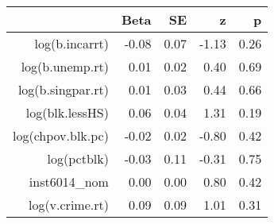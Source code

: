 \begin{table}[ht]
\centering
\begin{tabular}{rrrrr}
  \hline
 & Beta & SE & z & p \\ 
  \hline
log(b.incarrt) & -0.08 & 0.07 & -1.13 & 0.26 \\ 
  log(b.unemp.rt) & 0.01 & 0.02 & 0.40 & 0.69 \\ 
  log(b.singpar.rt) & 0.01 & 0.03 & 0.44 & 0.66 \\ 
  log(blk.lessHS) & 0.06 & 0.04 & 1.31 & 0.19 \\ 
  log(chpov.blk.pc) & -0.02 & 0.02 & -0.80 & 0.42 \\ 
  log(pctblk) & -0.03 & 0.11 & -0.31 & 0.75 \\ 
  inst6014\_nom & 0.00 & 0.00 & 0.80 & 0.42 \\ 
  log(v.crime.rt) & 0.09 & 0.09 & 1.01 & 0.31 \\ 
   \hline
\end{tabular}
\end{table}
